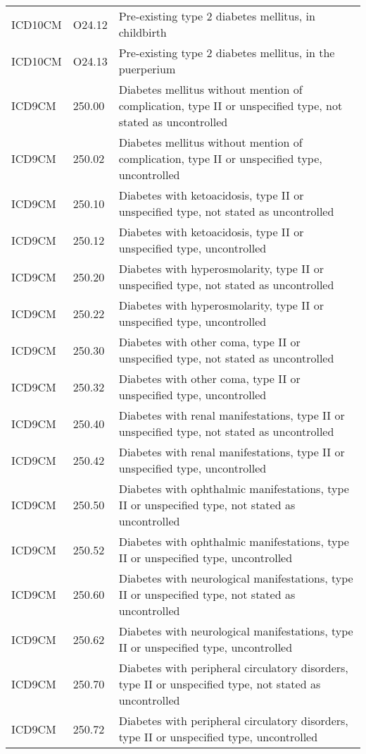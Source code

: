 \begin{longtable}{p{}p{}p{}}
  ICD10CM & O24.12 & Pre-existing type 2 diabetes mellitus, in childbirth \\ 
  ICD10CM & O24.13 & Pre-existing type 2 diabetes mellitus, in the puerperium \\ 
  ICD9CM & 250.00 & Diabetes mellitus without mention of complication, type II or unspecified type, not stated as uncontrolled \\ 
  ICD9CM & 250.02 & Diabetes mellitus without mention of complication, type II or unspecified type, uncontrolled \\ 
  ICD9CM & 250.10 & Diabetes with ketoacidosis, type II or unspecified type, not stated as uncontrolled \\ 
  ICD9CM & 250.12 & Diabetes with ketoacidosis, type II or unspecified type, uncontrolled \\ 
  ICD9CM & 250.20 & Diabetes with hyperosmolarity, type II or unspecified type, not stated as uncontrolled \\ 
  ICD9CM & 250.22 & Diabetes with hyperosmolarity, type II or unspecified type, uncontrolled \\ 
  ICD9CM & 250.30 & Diabetes with other coma, type II or unspecified type, not stated as uncontrolled \\ 
  ICD9CM & 250.32 & Diabetes with other coma, type II or unspecified type, uncontrolled \\ 
  ICD9CM & 250.40 & Diabetes with renal manifestations, type II or unspecified type, not stated as uncontrolled \\ 
  ICD9CM & 250.42 & Diabetes with renal manifestations, type II or unspecified type, uncontrolled \\ 
  ICD9CM & 250.50 & Diabetes with ophthalmic manifestations, type II or unspecified type, not stated as uncontrolled \\ 
  ICD9CM & 250.52 & Diabetes with ophthalmic manifestations, type II or unspecified type, uncontrolled \\ 
  ICD9CM & 250.60 & Diabetes with neurological manifestations, type II or unspecified type, not stated as uncontrolled \\ 
  ICD9CM & 250.62 & Diabetes with neurological manifestations, type II or unspecified type, uncontrolled \\ 
  ICD9CM & 250.70 & Diabetes with peripheral circulatory disorders, type II or unspecified type, not stated as uncontrolled \\ 
  ICD9CM & 250.72 & Diabetes with peripheral circulatory disorders, type II or unspecified type, uncontrolled \\ 

\end{longtable}

